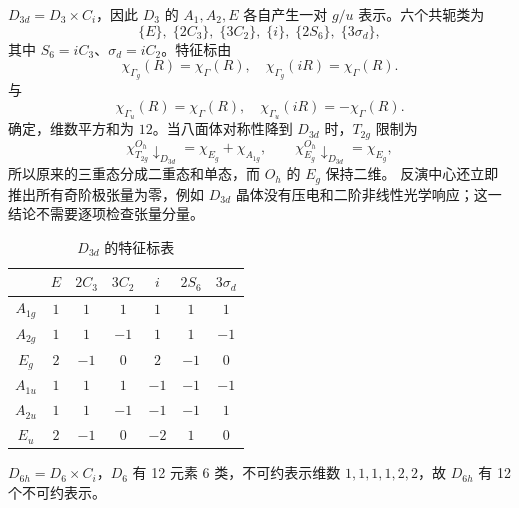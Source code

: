 $D_{3d}=D_3\times C_i$，因此 $D_3$ 的 $A_1,A_2,E$ 各自产生一对 $g/u$ 表示。六个共轭类为
\[
\{E\},\;\{2C_3\},\;\{3C_2\},\;\{i\},\;\{2S_6\},\;\{3\sigma_d\},
\]
其中 $S_6=iC_3$、$\sigma_d=iC_2$。特征标由
\[
\chi_{\Gamma_g}(R)=\chi_{\Gamma}(R),\quad\chi_{\Gamma_g}(iR)=\chi_{\Gamma}(R).
\]
与
\[
\chi_{\Gamma_u}(R)=\chi_{\Gamma}(R),\quad\chi_{\Gamma_u}(iR)=-\chi_{\Gamma}(R).
\]
确定，维数平方和为 $12$。当八面体对称性降到 $D_{3d}$ 时，$T_{2g}$ 限制为
\begin{equation*}
\chi_{T_{2g}}^{O_h}\downarrow_{D_{3d}}=\chi_{E_g}+\chi_{A_{1g}},\qquad \chi_{E_g}^{O_h}\downarrow_{D_{3d}}=\chi_{E_g},
\end{equation*}
所以原来的三重态分成二重态和单态，而 $O_h$ 的 $E_g$ 保持二维。
反演中心还立即推出所有奇阶极张量为零，例如 $D_{3d}$ 晶体没有压电和二阶非线性光学响应；这一结论不需要逐项检查张量分量。

\begin{table}[htbp]

\centering
\caption{$D_{3d}$ 的特征标表}
\label{tab:d3d-character}
\begin{tabular}{c|cccccc}
\toprule
 & $E$ & $2C_3$ & $3C_2$ & $i$ & $2S_6$ & $3\sigma_d$ \\
\midrule
$A_{1g}$ & $1$&$1$&$1$&$1$&$1$&$1$ \\
$A_{2g}$ & $1$&$1$&$-1$&$1$&$1$&$-1$ \\
$E_g$   & $2$&$-1$&$0$&$2$&$-1$&$0$ \\
$A_{1u}$ & $1$&$1$&$1$&$-1$&$-1$&$-1$ \\
$A_{2u}$ & $1$&$1$&$-1$&$-1$&$-1$&$1$ \\
$E_u$   & $2$&$-1$&$0$&$-2$&$1$&$0$ \\
\bottomrule
\end{tabular}

\end{table}

$D_{6h}=D_6\times C_i$，$D_6$ 有 12 元素 6 类，不可约表示维数 $1,1,1,1,2,2$，故 $D_{6h}$ 有 12 个不可约表示。

